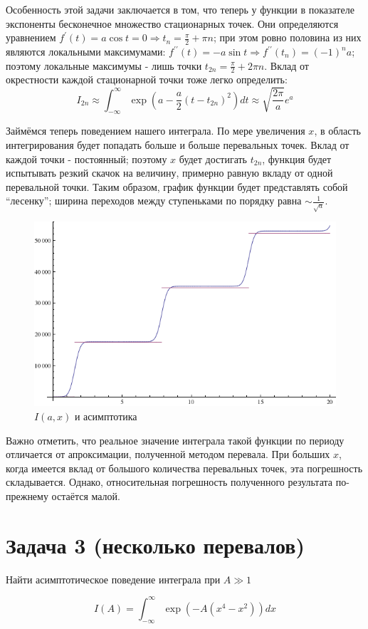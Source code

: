 \documentclass[a4paper,12pt]{article}
\begin{document}
Особенность этой задачи заключается в том, что теперь у функции в
показателе экспоненты бесконечное множество стационарных точек. Они
определяются уравнением $f^{\prime}(t)=a\cos t=0\Rightarrow t_{n}=\frac{\pi}{2}+\pi n$;
при этом ровно половина из них являются локальными максимумами: $f^{\prime\prime}(t)=-a\sin t\Rightarrow f^{\prime\prime}(t_{n})=\left(-1\right)^{n}a$;
поэтому локальные максимумы - лишь точки $t_{2n}=\frac{\pi}{2}+2\pi n$.
Вклад от окрестности каждой стационарной точки тоже легко определить:
\[
I_{2n}\approx\int_{-\infty}^{\infty}\exp(a-\frac{a}{2}(t-t_{2n})^{2})dt\approx\sqrt{\frac{2\pi}{a}}e^{a}
\]

\noindent
Займёмся теперь поведением нашего интеграла. По мере увеличения $x$,
в область интегрирования будет попадать больше и больше перевальных
точек. Вклад от каждой точки - постоянный; поэтому $x$ будет достигать
$t_{2n}$, функция будет испытывать резкий скачок на величину, примерно
равную вкладу от одной перевальной точки. Таким образом, график функции
будет представлять собой ``лесенку''; ширина переходов между ступеньками по порядку равна
 $\sim\frac{1}{\sqrt{a}}$.

\begin{figure}[h]
	\caption{$I(a,x)$ и асимптотика}
	\centering
	\includegraphics[width=0.5\columnwidth]{ladder.png}
\end{figure}

\noindent
Важно отметить, что реальное значение интеграла
такой функции по периоду отличается от апроксимации, полученной методом
перевала. При больших $x$, когда имеется вклад от большого количества
перевальных точек, эта погрешность складывается. Однако, относительная погрешность полученного результата по-прежнему остаётся малой.

\section{Задача 3 (несколько перевалов)}

Найти асимптотическое поведение интеграла при $A\gg1$

\[
I(A)=\int_{-\infty}^{\infty}\exp(-A(x^{4}-x^{2}))dx
\]
\end{document}
